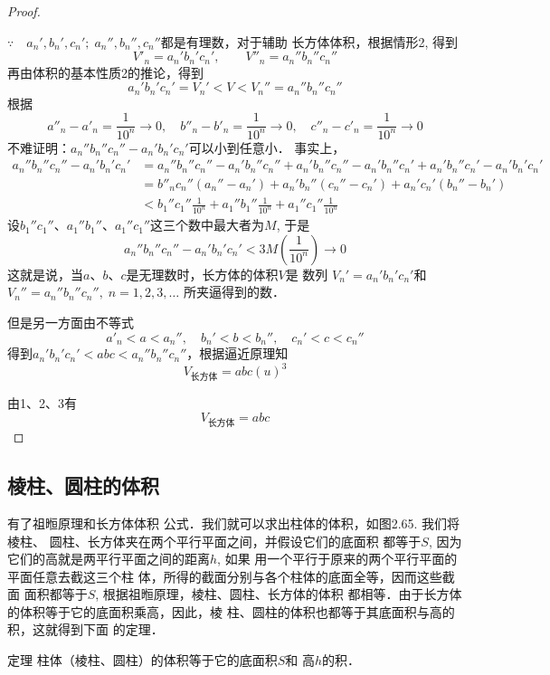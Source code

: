 \begin{proof}
\begin{enumerate}
$\because\quad a_n', b_n', c_n';\; a_n'', b_n'', c_n''$都是有理数，对于辅助
长方体体积，根据情形2, 得到
\[V'_n=a_n'b_n'c_n', \qquad V''_n=a_n''b_n''c_n''\]
再由体积的基本性质2的推论，得到
\[a_n'b_n'c_n'=V_n'<V<V_n'' =a_n''b_n''c_n''\]
根据
\[a''_n-a'_n=\frac{1}{10^n}\to 0,\quad b''_n-b'_n=\frac{1}{10^n}\to 0,\quad c''_n-c'_n=\frac{1}{10^n}\to 0\]
不难证明：$a_n''b_n''c_n''-a_n'b_n'c_n'$可以小到任意小．
事实上，
\[\begin{split}
 a_n''b_n''c_n'' -a_n' b_n' c_n' 
&=a_n''b_n''c_n'' -a_n'b_n''c_n'' +a_n'b_n''c_n'' -a_n'b_n''c_n' +a_n'b_n''c_n' -a_n'b_n'c_n'\\ 
&=b''_n c_n'' (a_n''-a_n' )+a_n'b_n''(c_n''-c_n' )+a_n' c_n'(b_n''-b_n')\\
&<b_1''c_1''\frac{1}{10^n}+a_1''b_1''\frac{1}{10^n}+a_1''c_1''\frac{1}{10^n}
\end{split}\]
设$b_1''c_1''$、$a_1''b_1''$、$a_1''c_1''$这三个数中最大者为$M$, 于是
\[a_n''b_n''c_n''-a_n'b_n'c_n'<3M\left(\frac{1}{10^n}\right)\to 0\]
这就是说，当$a$、$b$、$c$是无理数时，长方体的体积$V$是
数列
$V_n' =a_n'b_n'c_n'$和$V_n''=a_n''b_n''c_n'',\; n=1,2,3,\ldots$
所夹逼得到的数．

但是另一方面由不等式
\[a'_n<a<a_n'',\quad b_n'<b<b_n'', \quad c_n'<c<c_n''\]
得到$a_n'b_n'c_n' <abc<a_n''b_n''c_n''$，根据逼近原理知
\[V_{\text{长方体}}=abc(u)^3\]
\end{enumerate}

由1、2、3有
\[V_{\text{长方体}}=abc\]
\end{proof}

\subsection{棱柱、圆柱的体积}

有了祖暅原理和长方体体积
公式．我们就可以求出柱体的体积，如图2.65. 我们将棱柱、
圆柱、长方体夹在两个平行平面之间，并假设它们的底面积
都等于$S$, 因为它们的高就是两平行平面之间的距离$h$, 如果
用一个平行于原来的两个平行平面的平面任意去截这三个柱
体，所得的截面分别与各个柱体的底面全等，因而这些截面
面积都等于$S$, 根据祖暅原理，棱柱、圆柱、长方体的体积
都相等．由于长方体的体积等于它的底面积乘高，因此，棱
柱、圆柱的体积也都等于其底面积与高的积，这就得到下面
的定理．

\begin{blk}
   {定理} 柱体（棱柱、圆柱）的体积等于它的底面积$S$和
高$h$的积． 
\end{blk}


